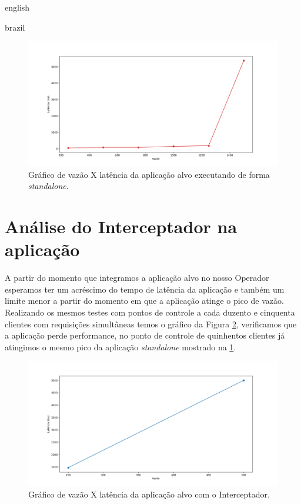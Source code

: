 \begin{otherlanguage*}{english}
\begin{otherlanguage*}{brazil}
\begin{figure}[h]
\centering
\includegraphics[scale=0.46]{images/standalone_graph.png}
\caption{Gráfico de vazão X latência da aplicação alvo executando de forma \textit{standalone}.}
\label{fig:analysis-standalone}
\end{figure}

\section{Análise do Interceptador na aplicação}

A partir do momento que integramos a aplicação alvo no nosso Operador esperamos ter um
acréscimo do tempo de latência da aplicação e também um limite menor a partir do momento
em que a aplicação atinge o pico de vazão. Realizando os mesmos testes com pontos de controle
a cada duzento e cinquenta clientes com requisições simultâneas temos o gráfico da Figura
\ref{fig:analysis-interceptor}, verificamos que a aplicação perde performance, no ponto de
controle de quinhentos clientes já atingimos o mesmo pico da aplicação \textit{standalone}
mostrado na \ref{fig:analysis-standalone}.

\begin{figure}[h]
\centering
\includegraphics[scale=0.46]{images/interceptor_graph.png}
\caption{Gráfico de vazão X latência da aplicação alvo com o Interceptador.}
\label{fig:analysis-interceptor}
\end{figure}


\end{otherlanguage*}
\end{otherlanguage*}
